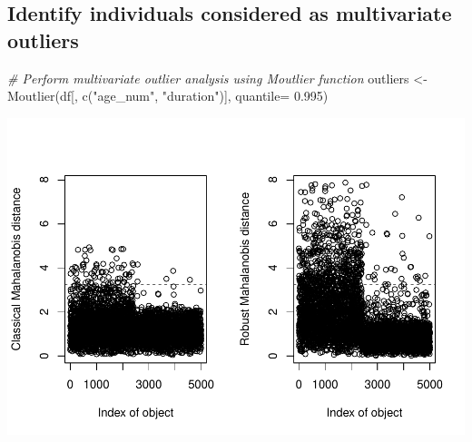 \documentclass[
]{article}
\newenvironment{Shaded}{\begin{snugshade}}{\end{snugshade}}
\newcommand{\AttributeTok}[1]{\textcolor[rgb]{0.77,0.63,0.00}{#1}}
\newcommand{\CommentTok}[1]{\textcolor[rgb]{0.56,0.35,0.01}{\textit{#1}}}
\newcommand{\ConstantTok}[1]{\textcolor[rgb]{0.00,0.00,0.00}{#1}}
\newcommand{\DecValTok}[1]{\textcolor[rgb]{0.00,0.00,0.81}{#1}}
\newcommand{\FloatTok}[1]{\textcolor[rgb]{0.00,0.00,0.81}{#1}}
\newcommand{\FunctionTok}[1]{\textcolor[rgb]{0.00,0.00,0.00}{#1}}
\newcommand{\NormalTok}[1]{#1}
\newcommand{\OtherTok}[1]{\textcolor[rgb]{0.56,0.35,0.01}{#1}}
\newcommand{\SpecialCharTok}[1]{\textcolor[rgb]{0.00,0.00,0.00}{#1}}
\newcommand{\StringTok}[1]{\textcolor[rgb]{0.31,0.60,0.02}{#1}}
\begin{document}
\hypertarget{identify-individuals-considered-as-multivariate-outliers}{%
\subsection{Identify individuals considered as multivariate
outliers}\label{identify-individuals-considered-as-multivariate-outliers}}

\begin{Shaded}
\begin{Highlighting}[]
\CommentTok{\# Perform multivariate outlier analysis using Moutlier function}
\NormalTok{outliers }\OtherTok{\textless{}{-}} \FunctionTok{Moutlier}\NormalTok{(df[, }\FunctionTok{c}\NormalTok{(}\StringTok{"age\_num"}\NormalTok{, }\StringTok{"duration"}\NormalTok{)], }\AttributeTok{quantile=} \FloatTok{0.995}\NormalTok{)}
\end{Highlighting}
\end{Shaded}

\includegraphics{Entrega-1_files/figure-latex/unnamed-chunk-51-1.pdf}

\begin{Shaded}
\end{Shaded}
\end{document}
